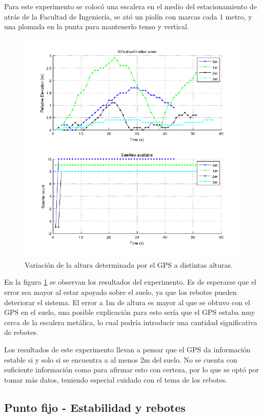 \documentclass[spanish,12pt,a4paper,titlepage]{report}
\begin{document}
Para este experimento se colocó una escalera en el medio del estacionamiento de atrás de la Facultad de Ingeniería, se ató un piolín con marcas cada 1 metro, y una plomada en la punta para mantenerlo tenso y vertical.

\begin{figure}[h!]
  \begin{center}
  \includegraphics[width=.7\textwidth]{./img/altura_punto_fijo_fing.png}
  \end{center}
  \caption{Variación de la altura determinada por el GPS a distintas alturas.}
  \label{fig:altura_punto_fijo_fing.png}
\end{figure}

En la figura \ref{fig:altura_punto_fijo_fing.png} se observan los resultados del experimento. Es de esperarse que el error sea mayor al estar apoyado sobre el suelo, ya que los rebotes pueden deteriorar el sistema. El error a 1m de altura es mayor al que se obtuvo con el GPS en el suelo, una posible explicación para esto sería que el GPS estaba muy cerca de la escalera metálica, lo cual podría introducir una cantidad significativa de rebotes.

Los resultados de este experimento llevan a pensar que el GPS da información estable si y solo si se encuentra a al menos 2m del suelo. No se cuenta con suficiente información como para afirmar esto con certeza, por lo que se optó por tomar más datos, teniendo especial cuidado con el tema de los rebotes.

\subsection{Punto fijo - Estabilidad y rebotes}
\label{sec:altura-punto-fijo-estabilidad}
\end{document}
